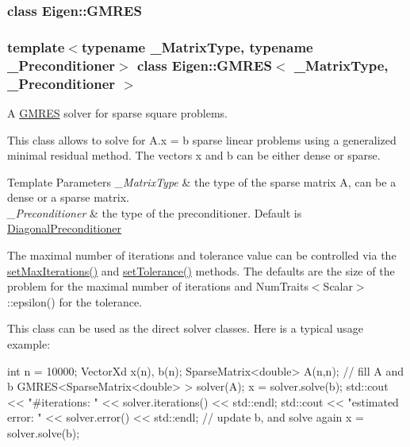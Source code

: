 \label{class_eigen_1_1_g_m_r_e_s}
\subsubsection{class Eigen\+:\+:G\+M\+R\+ES}
\subsubsection*{template$<$typename \+\_\+\+Matrix\+Type, typename \+\_\+\+Preconditioner$>$\newline
class Eigen\+::\+G\+M\+R\+E\+S$<$ \+\_\+\+Matrix\+Type, \+\_\+\+Preconditioner $>$}

A \hyperlink{group___iterative_linear_solvers___module_class_eigen_1_1_g_m_r_e_s}{G\+M\+R\+ES} solver for sparse square problems. 

This class allows to solve for A.\+x = b sparse linear problems using a generalized minimal residual method. The vectors x and b can be either dense or sparse.


\begin{DoxyTemplParams}{Template Parameters}
{\em \+\_\+\+Matrix\+Type} & the type of the sparse matrix A, can be a dense or a sparse matrix. \\
\hline
{\em \+\_\+\+Preconditioner} & the type of the preconditioner. Default is \hyperlink{group___iterative_linear_solvers___module_class_eigen_1_1_diagonal_preconditioner}{Diagonal\+Preconditioner}\\
\hline
\end{DoxyTemplParams}
The maximal number of iterations and tolerance value can be controlled via the \hyperlink{group___iterative_linear_solvers___module_af83de7a7d31d9d4bd1fef6222b07335b}{set\+Max\+Iterations()} and \hyperlink{group___iterative_linear_solvers___module_ac160a444af8998f93da9aa30e858470d}{set\+Tolerance()} methods. The defaults are the size of the problem for the maximal number of iterations and Num\+Traits$<$\+Scalar$>$\+::epsilon() for the tolerance.

This class can be used as the direct solver classes. Here is a typical usage example\+: 
\begin{DoxyCode}
\textcolor{keywordtype}{int} n = 10000;
VectorXd x(n), b(n);
SparseMatrix<double> A(n,n);
\textcolor{comment}{// fill A and b}
GMRES<SparseMatrix<double> > solver(A);
x = solver.solve(b);
std::cout << \textcolor{stringliteral}{"#iterations:     "} << solver.iterations() << std::endl;
std::cout << \textcolor{stringliteral}{"estimated error: "} << solver.error()      << std::endl;
\textcolor{comment}{// update b, and solve again}
x = solver.solve(b);
\end{DoxyCode}


